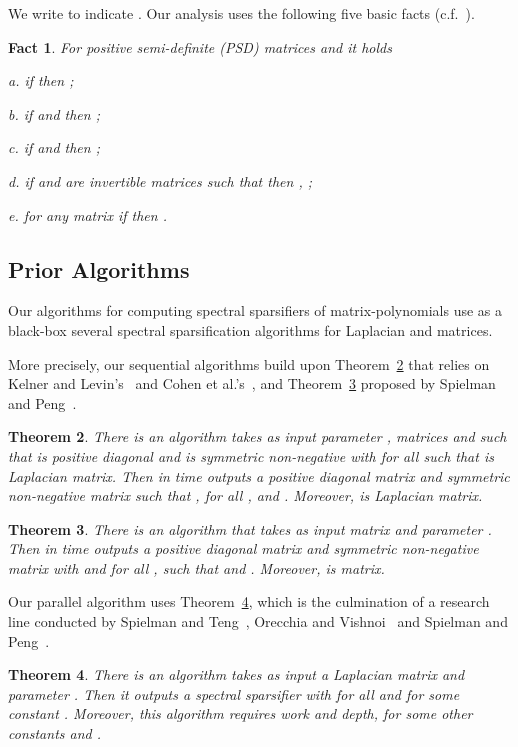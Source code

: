 \documentclass[11pt]{article}
\newtheorem{thm}{Theorem}  \newtheorem{fact}[thm]{Fact}
\numberwithin{thm}{section}
\begin{document}
We write  to indicate . Our analysis uses the following five basic facts (c.f.~\cite{ST14,BGHNT06}).

\begin{fact}\label{fact_fiveProps}
For positive semi-definite (PSD) matrices
 and  it holds

a. if  then ;

b. if  and  then ;

c. if  and 
then ;

d. if  and  are invertible matrices such that 
then , ;

e. for any matrix  if  then .
\end{fact}


\subsection{Prior Algorithms}

Our algorithms for computing spectral sparsifiers of matrix-polynomials use as a black-box several spectral sparsification algorithms for Laplacian and  matrices.

More precisely, our sequential algorithms build upon Theorem~\ref{thm_KL13} that relies on Kelner and Levin's~\cite[Theorem 3]{KL13} and Cohen et al.'s~\cite[Lemma 4]{CLMMPS15}, and Theorem~\ref{thm_PS14} proposed by Spielman and Peng~\cite[Corollary 6.4]{PS14}.

\begin{thm}\label{thm_KL13}\cite{KL13}
There is an algorithm  takes
as input parameter , matrices  and  such that  is positive diagonal and  is symmetric non-negative with  for all  such that  is Laplacian matrix. Then in  time outputs a positive diagonal matrix  and symmetric non-negative matrix  such that ,
 for all , and . Moreover,  is Laplacian matrix.
\end{thm}

\begin{thm}\label{thm_PS14}\cite{PS14}
There is an algorithm  that takes
as input  matrix  and parameter .
Then in  time outputs
a positive diagonal matrix  and symmetric non-negative
matrix  with 
and  for all , such that  and . Moreover,  is  matrix.
\end{thm}

Our parallel algorithm uses Theorem~\ref{thm_ParallelLaplacianSS}, which is the culmination of a research line conducted by Spielman and Teng~\cite{ST11}, Orecchia and Vishnoi~\cite{OV11} and Spielman and Peng~\cite{PS14}.

\begin{thm}\label{thm_ParallelLaplacianSS}\cite{PS14}
There is an algorithm  takes as input a Laplacian matrix  and parameter . Then it outputs a spectral sparsifier  with  for all  and  for some constant . Moreover, this algorithm requires  work and  depth, for some other constants  and .
\end{thm}
\end{document}
